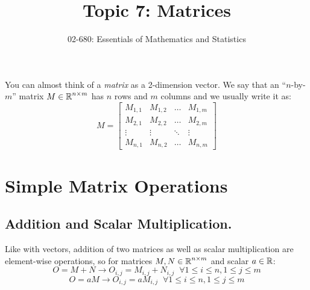 


\title{Topic 7: Matrices}
\author{02-680: Essentials of Mathematics and Statistics}


\maketitle

You can almost think of a \emph{matrix} as a 2-dimension vector. 
We say that an ``$n$-by-$m$'' matrix $M \in \operatorname{\mathbb{R}}^{n\times m}$ has $n$ rows and $m$ columns and we usually write it as:
\[
M = \left[\begin{matrix}
M_{1,1}& 	M_{1,2}& 	\dots& M_{1,m}\\
M_{2,1}& 	M_{2,2}& 	\dots& M_{2,m}\\ 
\vdots & \vdots & \ddots & \vdots \\ 
M_{n,1}& 	M_{n,2}& 	\dots& M_{n,m}
\end{matrix}\right]
\]



\section{Simple Matrix Operations}

\subsection{Addition and Scalar Multiplication.}
Like with vectors, addition of two matrices as well as scalar multiplication are element-wise operations, so for matrices $M,N \in \operatorname{\mathbb{R}}^{n\times m}$ and scalar $a\in\operatorname{\mathbb{R}}$:
\[O = M+N \rightarrow O_{i,j} = M_{i,j} + N_{i,j} \;\; \forall 1 \le i \le n, 1 \le j \le m\]
\[O = aM \rightarrow O_{i,j} = a M_{i,j} \;\; \forall 1 \le i \le n, 1 \le j \le m\]

